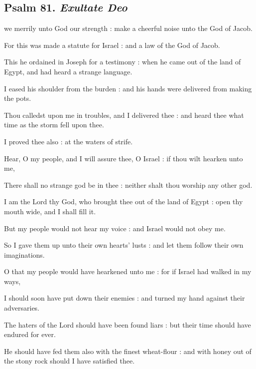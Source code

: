 \subsection{Psalm 81. \textit{Exultate Deo}}

 we merrily unto God our strength : make a cheerful noise unto the God of Jacob.\par
{}
For this was made a statute for Israel : and a law of the God of Jacob.\par
{}This he ordained in Joseph for a testimony : when he came out of the land of Egypt, and had heard a strange language.\par
{}I eased his shoulder from the burden : and his hands were delivered from making the pots.\par
{}Thou calledst upon me in troubles, and I delivered thee : and heard thee what time as the storm fell upon thee.\par
{}I proved thee also : at the waters of strife.\par
{}Hear, O my people, and I will assure thee, O Israel : if thou wilt hearken unto me,\par
{}There shall no strange god be in thee : neither shalt thou worship any other god.\par
{}I am the Lord thy God, who brought thee out of the land of Egypt : open thy mouth wide, and I shall fill it.\par
{}But my people would not hear my voice : and Israel would not obey me.\par
{}So I gave them up unto their own hearts' lusts : and let them follow their own imaginations.\par
{}O that my people would have hearkened unto me : for if Israel had walked in my ways,\par
{}I should soon have put down their enemies : and turned my hand against their adversaries.\par
{}The haters of the Lord should have been found liars : but their time should have endured for ever.\par
{}He should have fed them also with the finest wheat-flour : and with honey out of the stony rock should I have satisfied thee.\par

